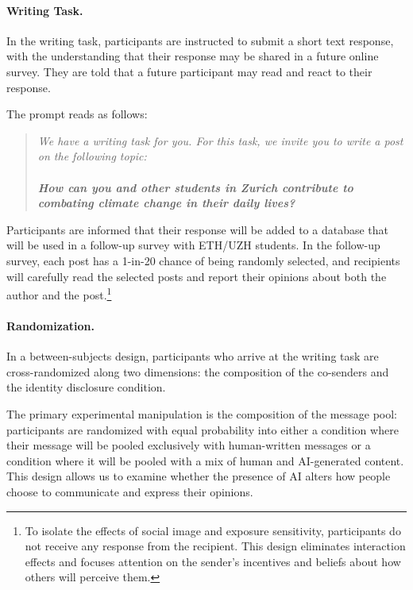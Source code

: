 \documentclass[12pt,notitlepage]{article}
\theoremstyle{plain}
\theoremstyle{plain}
\theoremstyle{definition}
\theoremstyle{definition}
\theoremstyle{assumption}
\theoremstyle{plain}
\theoremstyle{plain}
\theoremstyle{plain}
\theoremstyle{plain}
\theoremstyle{definition}%
\theoremstyle{plain}
\theoremstyle{plain}
\theoremstyle{plain}
\theoremstyle{plain}
\begin{document}
\paragraph{Writing Task.}

In the writing task, participants are instructed to submit a short text response, with the understanding that their response may be shared in a future online survey. They are told that a future participant may read and react to their response.


The prompt reads as follows:
\begin{quote}
\textit{We have a writing task for you. For this task, we invite you to write a post on the following topic:
\\
\\
\textbf{How can you and other students in Zurich contribute to combating climate change in their daily lives?}}
\end{quote}
Participants are informed that their response will be added to a database that will be used in a follow-up survey with ETH/UZH students. In the follow-up survey, each post has a 1-in-20 chance of being randomly selected, and recipients will carefully read the selected posts and report their opinions about both the author and the post.\footnote{To isolate the effects of social image and exposure sensitivity, participants do not receive any response from the recipient. This design eliminates interaction effects and focuses attention on the sender's incentives and beliefs about how others will perceive them.}




\paragraph{Randomization. }

In a between-subjects design, participants who arrive at the writing task are cross-randomized along two dimensions: the composition of the co-senders and the identity disclosure condition.

The primary experimental manipulation is the composition of the message pool: participants are randomized with equal probability into either a condition where their message will be pooled exclusively with human-written messages or a condition where it will be pooled with a mix of human and AI-generated content. This design allows us to examine whether the presence of AI alters how people choose to communicate and express their opinions.
\end{document}
